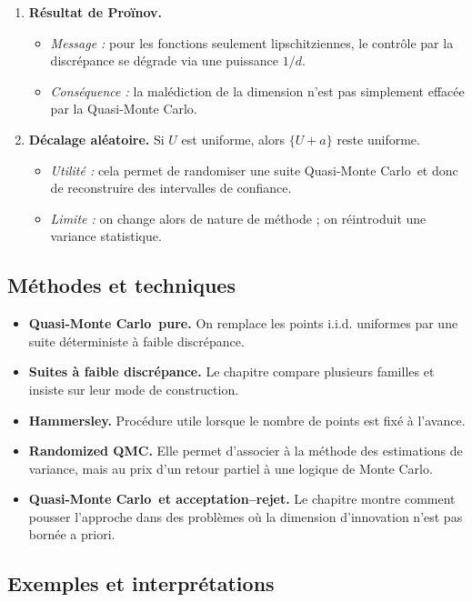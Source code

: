 \documentclass[11pt,a4paper]{article}
\newcommand{\mc}{Monte Carlo}
\newcommand{\qmc}{Quasi-Monte Carlo}
\begin{document}
\begin{enumerate}[label=\textbf{\arabic*.}]
  \item \textbf{Résultat de Proïnov.}
  \begin{itemize}
    \item \emph{Message :} pour les fonctions seulement lipschitziennes, le contrôle par la discrépance se dégrade via une puissance $1/d$.
    \item \emph{Conséquence :} la malédiction de la dimension n'est pas simplement effacée par la \qmc.
  \end{itemize}

  \item \textbf{Décalage aléatoire.} Si $U$ est uniforme, alors $\{U+a\}$ reste uniforme.
  \begin{itemize}
    \item \emph{Utilité :} cela permet de randomiser une suite \qmc\ et donc de reconstruire des intervalles de confiance.
    \item \emph{Limite :} on change alors de nature de méthode ; on réintroduit une variance statistique.
  \end{itemize}
\end{enumerate}

\subsection{Méthodes et techniques}

\begin{itemize}
  \item \textbf{\qmc\ pure.} On remplace les points i.i.d. uniformes par une suite déterministe à faible discrépance.
  \item \textbf{Suites à faible discrépance.} Le chapitre compare plusieurs familles et insiste sur leur mode de construction.
  \item \textbf{Hammersley.} Procédure utile lorsque le nombre de points est fixé à l'avance.
  \item \textbf{Randomized QMC.} Elle permet d'associer à la méthode des estimations de variance, mais au prix d'un retour partiel à une logique de \mc.
  \item \textbf{\qmc\ et acceptation--rejet.} Le chapitre montre comment pousser l'approche dans des problèmes où la dimension d'innovation n'est pas bornée a priori.
\end{itemize}

\subsection{Exemples et interprétations}
\end{document}
